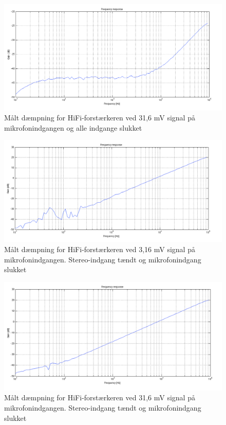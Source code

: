 \begin{figure}[h]
\centering
\includegraphics[width=\textwidth]{maalerapporter/final/daempning/final_daempning_mic_31,6mv_alloff.png}
\caption{Målt dæmpning for HiFi-forstærkeren ved 31,6 mV signal på mikrofonindgangen og alle indgange slukket}
\label{maalerapport_final10}
\end{figure}

\begin{figure}[h]
\centering
\includegraphics[width=\textwidth]{maalerapporter/final/daempning/final_daempning_mic_3,16mv_stereoon.png}
\caption{Målt dæmpning for HiFi-forstærkeren ved 3,16 mV signal på mikrofonindgangen. Stereo-indgang tændt og mikrofonindgang slukket}
\label{maalerapport_final11}
\end{figure}

\begin{figure}[h]
\centering
\includegraphics[width=\textwidth]{maalerapporter/final/daempning/final_daempning_mic_31,6mv_stereoon.png}
\caption{Målt dæmpning for HiFi-forstærkeren ved 31,6 mV signal på mikrofonindgangen. Stereo-indgang tændt og mikrofonindgang slukket}
\label{maalerapport_final12}
\end{figure}


